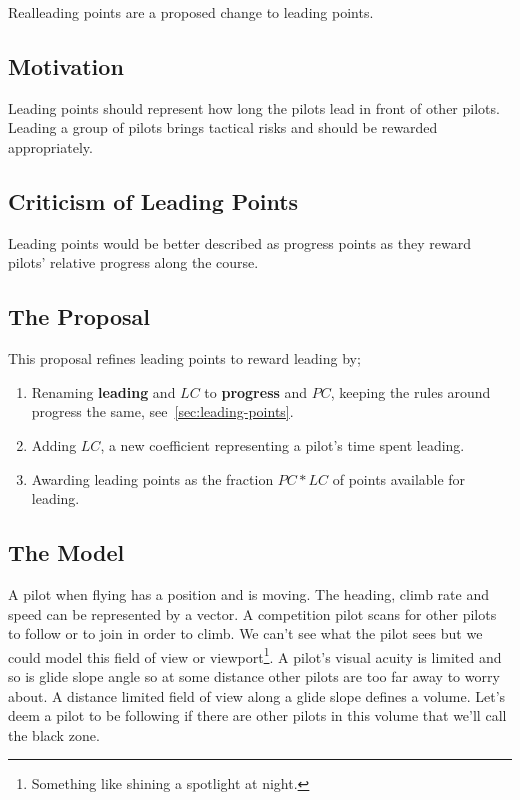 \documentclass[gap.tex]{subfiles}
\begin{document}
\label{sec:real-leading}
Real\footnotemark leading points are a proposed change to leading points.

\subsection{Motivation}
Leading points should represent how long the pilots lead in front of other
pilots. Leading a group of pilots brings tactical risks and should be rewarded
appropriately.

\subsection{Criticism of Leading Points}
Leading points would be better described as progress points as they reward
pilots' relative progress along the course.

\subsection{The Proposal}
This proposal refines leading points to reward leading by;

\begin{enumerate}
    \item Renaming \textbf{leading} and \(LC\) to \textbf{progress} and \(PC\),
        keeping the rules around progress the same,
        see~\ref{sec:leading-points}.

    \item Adding \(LC\), a new coefficient representing a pilot's time spent
        leading.

    \item Awarding leading points as the fraction \(PC * LC\) of points
        available for leading.
\end{enumerate}

\subsection{The Model}
A pilot when flying has a position and is moving. The heading, climb rate and
speed can be represented by a vector. A competition pilot scans for other
pilots to follow or to join in order to climb. We can't see what the pilot sees
but we could model this field of view or viewport\footnote{Something like
shining a spotlight at night.}. A pilot's visual acuity is limited and so is
glide slope angle so at some distance other pilots are too far away to worry
about. A distance limited field of view along a glide slope defines a volume.
Let's deem a pilot to be following if there are other pilots in this volume
that we'll call the black zone.
\end{document}
